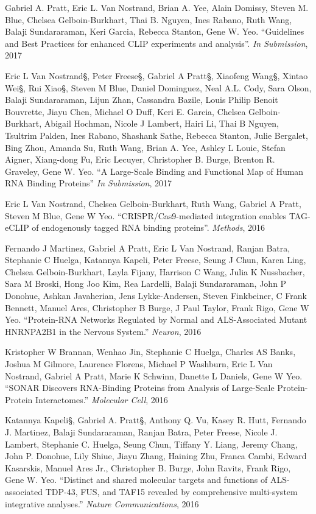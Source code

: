 \begin{frontmatter}
\begin{vitapage}
\begin{publications}
        \item Gabriel A. Pratt, Eric L. Van Nostrand, Brian A. Yee, Alain Domissy, Steven M. Blue, Chelsea Gelboin-Burkhart, Thai B. Nguyen, Ines Rabano, Ruth Wang, Balaji Sundararaman, Keri Garcia, Rebecca Stanton, Gene W. Yeo. ``Guidelines and Best Practices for enhanced CLIP experiments and analysis''. \emph{In Submission}, 2017
        \item Eric L Van Nostrand§, Peter Freese§, Gabriel A Pratt§, Xiaofeng Wang§, Xintao Wei§, Rui Xiao§, Steven M Blue, Daniel Dominguez, Neal A.L. Cody, Sara Olson, Balaji Sundararaman, Lijun Zhan, Cassandra Bazile, Louis Philip Benoit Bouvrette, Jiayu Chen, Michael O Duff, Keri E. Garcia, Chelsea Gelboin-Burkhart, Abigail Hochman, Nicole J Lambert, Hairi Li, Thai B Nguyen, Tsultrim Palden, Ines Rabano, Shashank Sathe, Rebecca Stanton, Julie Bergalet, Bing Zhou, Amanda Su, Ruth Wang, Brian A. Yee, Ashley L Louie, Stefan Aigner, Xiang-dong Fu, Eric Lecuyer, Christopher B. Burge, Brenton R. Graveley, Gene W. Yeo. ``A Large-Scale Binding and Functional Map of Human RNA Binding Proteins'' \emph{In Submission}, 2017
        \item Eric L Van Nostrand, Chelsea Gelboin-Burkhart, Ruth Wang, Gabriel A Pratt, Steven M Blue, Gene W Yeo. ``CRISPR/Cas9-mediated integration enables TAG-eCLIP of endogenously tagged RNA binding proteins''. \emph{Methods}, 2016
      \item Fernando J Martinez, Gabriel A Pratt, Eric L Van Nostrand, Ranjan Batra, Stephanie C Huelga, Katannya Kapeli, Peter Freese, Seung J Chun, Karen Ling, Chelsea Gelboin-Burkhart, Layla Fijany, Harrison C Wang, Julia K Nussbacher, Sara M Broski, Hong Joo Kim, Rea Lardelli, Balaji Sundararaman, John P Donohue, Ashkan Javaherian, Jens Lykke-Andersen, Steven Finkbeiner, C Frank Bennett, Manuel Ares, Christopher B Burge, J Paul Taylor, Frank Rigo, Gene W Yeo. ``Protein-RNA Networks Regulated by Normal and ALS-Associated Mutant HNRNPA2B1 in the Nervous System.'' \emph{Neuron}, 2016
      \item Kristopher W Brannan, Wenhao Jin, Stephanie C Huelga, Charles AS Banks, Joshua M Gilmore, Laurence Florens, Michael P Washburn, Eric L Van Nostrand, Gabriel A Pratt, Marie K Schwinn, Danette L Daniels, Gene W Yeo. ``SONAR Discovers RNA-Binding Proteins from Analysis of Large-Scale Protein-Protein Interactomes.'' \emph{Molecular Cell}, 2016
      \item Katannya Kapeli§, Gabriel A. Pratt§, Anthony Q. Vu, Kasey R. Hutt, Fernando J. Martinez, Balaji Sundararaman, Ranjan Batra, Peter Freese, Nicole J. Lambert, Stephanie C. Huelga, Seung Chun, Tiffany Y. Liang, Jeremy Chang, John P. Donohue, Lily Shiue, Jiayu Zhang, Haining Zhu, Franca Cambi, Edward Kasarskis, Manuel Ares Jr., Christopher B. Burge, John Ravits, Frank Rigo, Gene W. Yeo. ``Distinct and shared molecular targets and functions of ALS-associated TDP-43, FUS, and TAF15 revealed by comprehensive multi-system integrative analyses.'' \emph{Nature Communications}, 2016

\end{publications}
\end{vitapage}
\end{frontmatter}
